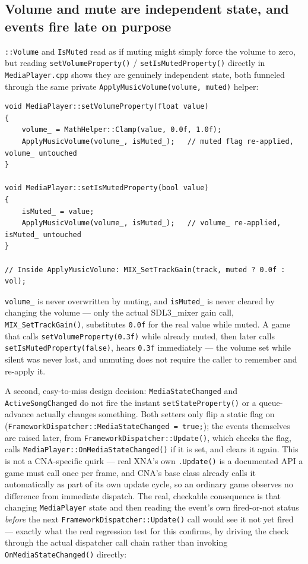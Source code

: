 \subsection{Volume and mute are independent state, and events fire late on purpose}

\texttt{::Volume} and \texttt{IsMuted} read as if muting might simply
force the volume to zero, but reading \texttt{setVolumeProperty()} /
\texttt{setIsMutedProperty()} directly in \texttt{MediaPlayer.cpp} shows they are genuinely
independent state, both funneled through the same private \texttt{ApplyMusicVolume(volume,
muted)} helper:

\begin{lstlisting}
void MediaPlayer::setVolumeProperty(float value)
{
    volume_ = MathHelper::Clamp(value, 0.0f, 1.0f);
    ApplyMusicVolume(volume_, isMuted_);   // muted flag re-applied, volume_ untouched
}

void MediaPlayer::setIsMutedProperty(bool value)
{
    isMuted_ = value;
    ApplyMusicVolume(volume_, isMuted_);   // volume_ re-applied, isMuted_ untouched
}

// Inside ApplyMusicVolume: MIX_SetTrackGain(track, muted ? 0.0f : vol);
\end{lstlisting}

\texttt{volume\_} is never overwritten by muting, and \texttt{isMuted\_} is never cleared by
changing the volume --- only the actual SDL3\_mixer gain call, \texttt{MIX\_SetTrackGain()},
substitutes \texttt{0.0f} for the real value while muted. A game that calls
\texttt{setVolumeProperty(0.3f)} while already muted, then later calls
\texttt{setIsMutedProperty(false)}, hears \texttt{0.3f} immediately --- the volume set while
silent was never lost, and unmuting does not require the caller to remember and re-apply it.

A second, easy-to-miss design decision: \texttt{MediaStateChanged} and \texttt{ActiveSongChanged}
do not fire the instant \texttt{setStateProperty()} or a queue-advance actually changes
something. Both setters only flip a static flag on 
(\texttt{FrameworkDispatcher::MediaStateChanged = true;}); the events themselves are raised
later, from \texttt{FrameworkDispatcher::Update()}, which checks the flag, calls
\texttt{MediaPlayer::OnMediaStateChanged()} if it is set, and clears it again. This is not a
CNA-specific quirk --- real XNA's own \texttt{.Update()} is a
documented API a game must call once per frame, and CNA's  base class already
calls it automatically as part of its own update cycle, so an ordinary game observes no
difference from immediate dispatch. The real, checkable consequence is that changing
\texttt{MediaPlayer} state and then reading the event's own fired-or-not status \emph{before}
the next \texttt{FrameworkDispatcher::Update()} call would see it not yet fired --- exactly
what the real regression test for this confirms, by driving the check through the actual
dispatcher call chain rather than invoking \texttt{OnMediaStateChanged()} directly:

